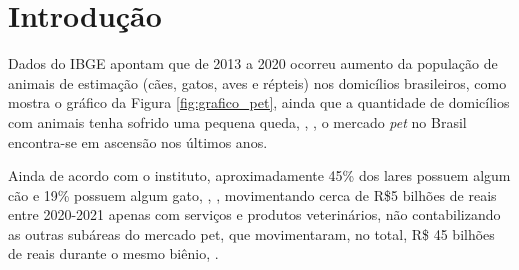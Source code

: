 \documentclass[
    12pt,               %
    openright,          %
    oneside,
    a4paper,            %
    BIBLATEX,           %
    TODO,               %
    english,            %
    brazil              %
    ]{ifsp-spo-inf-ctds}
\begin{document}
\listoffigures*
\cleardoublepage

\listoftables*
\cleardoublepage

\listofquadros*
\cleardoublepage





%




%
\tableofcontents*
\textual
\chapter[Introdução]{Introdução} \label{intro}
    
    Dados do IBGE apontam que de 2013 a 2020 ocorreu aumento da população de animais de estimação (cães, gatos, aves e répteis) nos domicílios brasileiros, como mostra o gráfico da Figura \ref{fig:grafico_pet}, ainda que a quantidade de domicílios com animais tenha sofrido uma pequena queda, , , o mercado \emph{pet} no Brasil encontra-se em ascensão nos últimos anos.
    
    Ainda de acordo com o instituto, aproximadamente 45\% dos lares possuem algum cão e 19\% possuem algum gato, , , movimentando cerca de R\$5 bilhões de reais entre 2020-2021 apenas com serviços e produtos veterinários, não contabilizando as outras subáreas do mercado pet, que movimentaram, no total, R\$ 45 bilhões de reais durante o mesmo biênio, .
    
\end{document}
